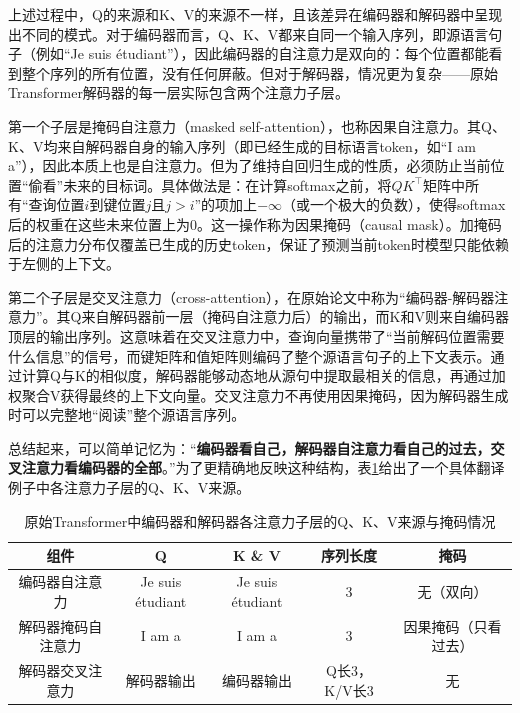 上述过程中，Q的来源和K、V的来源不一样，且该差异在编码器和解码器中呈现出不同的模式。对于编码器而言，Q、K、V都来自同一个输入序列，即源语言句子（例如“Je suis étudiant”），因此编码器的自注意力是双向的：每个位置都能看到整个序列的所有位置，没有任何屏蔽。但对于解码器，情况更为复杂——原始Transformer解码器的每一层实际包含两个注意力子层\cite{vaswani2023attentionneed}。

第一个子层是掩码自注意力（masked self-attention），也称因果自注意力。其Q、K、V均来自解码器自身的输入序列（即已经生成的目标语言token，如“I am a”），因此本质上也是自注意力。但为了维持自回归生成的性质，必须防止当前位置“偷看”未来的目标词。具体做法是：在计算softmax之前，将$QK^\top$矩阵中所有“查询位置$i$到键位置$j$且$j>i$”的项加上$-\infty$（或一个极大的负数），使得softmax后的权重在这些未来位置上为0。这一操作称为因果掩码（causal mask）\cite{vaswani2023attentionneed}。加掩码后的注意力分布仅覆盖已生成的历史token，保证了预测当前token时模型只能依赖于左侧的上下文。

第二个子层是交叉注意力（cross-attention），在原始论文中称为“编码器-解码器注意力”。其Q来自解码器前一层（掩码自注意力后）的输出，而K和V则来自编码器顶层的输出序列\cite{vaswani2023attentionneed}。这意味着在交叉注意力中，查询向量携带了“当前解码位置需要什么信息”的信号，而键矩阵和值矩阵则编码了整个源语言句子的上下文表示。通过计算Q与K的相似度，解码器能够动态地从源句中提取最相关的信息，再通过加权聚合V获得最终的上下文向量。交叉注意力不再使用因果掩码，因为解码器生成时可以完整地“阅读”整个源语言序列。

总结起来，可以简单记忆为：“\textbf{编码器看自己，解码器自注意力看自己的过去，交叉注意力看编码器的全部}。”为了更精确地反映这种结构，表\cref{tab:QKV}给出了一个具体翻译例子中各注意力子层的Q、K、V来源。
\begin{table}
    \centering\small
    \begin{tabular}{c|ccc|c}
        \toprule
        组件 & Q & K \& V & 序列长度 & 掩码 \\
        \midrule
        编码器自注意力 & Je suis étudiant & Je suis étudiant & 3 & 无（双向）\\
        解码器掩码自注意力 & I am a & I am a & 3 & 因果掩码（只看过去）\\
        解码器交叉注意力 & 解码器输出 & 编码器输出 & Q长3，K/V长3 & 无\\
        \bottomrule
    \end{tabular}
    \caption{原始Transformer中编码器和解码器各注意力子层的Q、K、V来源与掩码情况}
    \label{tab:QKV}
\end{table}

